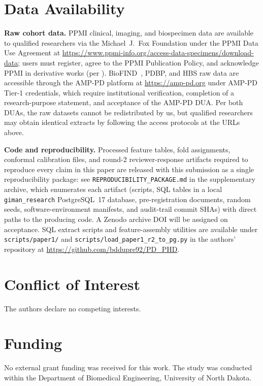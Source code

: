 \section*{Data Availability}
\label{p1:sec:data-availability}
\textbf{Raw cohort data.} PPMI clinical, imaging, and biospecimen data are available to qualified researchers via the Michael~J.~Fox Foundation under the PPMI Data Use Agreement at \url{https://www.ppmi-info.org/access-data-specimens/download-data}; users must register, agree to the PPMI Publication Policy, and acknowledge PPMI in derivative works (per \cite{marek2018ppmi}). BioFIND~\cite{russo2025}, PDBP, and HBS raw data are accessible through the AMP-PD platform at \url{https://amp-pd.org} under AMP-PD Tier-1 credentials, which require institutional verification, completion of a research-purpose statement, and acceptance of the AMP-PD DUA. Per both DUAs, the raw datasets cannot be redistributed by us, but qualified researchers may obtain identical extracts by following the access protocols at the URLs above.

\textbf{Code and reproducibility.} Processed feature tables, fold assignments, conformal calibration files, and round-2 reviewer-response artifacts required to reproduce every claim in this paper are released with this submission as a single reproducibility package: see \texttt{REPRODUCIBILITY\_PACKAGE.md} in the supplementary archive, which enumerates each artifact (scripts, SQL tables in a local \texttt{giman\_research} PostgreSQL~17 database, pre-registration documents, random seeds, software-environment manifests, and audit-trail commit SHAs) with direct paths to the producing code. A Zenodo archive DOI will be assigned on acceptance. SQL extract scripts and feature-assembly utilities are available under \texttt{scripts/paper1/} and \texttt{scripts/load\_paper1\_r2\_to\_pg.py} in the authors' repository at \url{https://github.com/bddupre92/PD_PHD}.

\section*{Conflict of Interest}
The authors declare no competing interests.

\section*{Funding}
No external grant funding was received for this work. The study was conducted within the Department of Biomedical Engineering, University of North Dakota.

